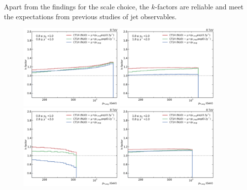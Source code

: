 Apart from the findings for the \ptavg scale choice, the $k$-factors are
reliable and meet the expectations from previous studies of jet observables.

\begin{figure}[htp]
    \centering
    \includegraphics[width=0.45\textwidth]{figures/theory/kfactor_comp_yb0ys0.pdf}\hfill
    \includegraphics[width=0.45\textwidth]{figures/theory/kfactor_comp_yb0ys1.pdf}
    \includegraphics[width=0.45\textwidth]{figures/theory/kfactor_comp_yb0ys2.pdf}\hfill
    \includegraphics[width=0.45\textwidth]{figures/theory/kfactor_comp_yb1ys0.pdf}

\end{figure}
